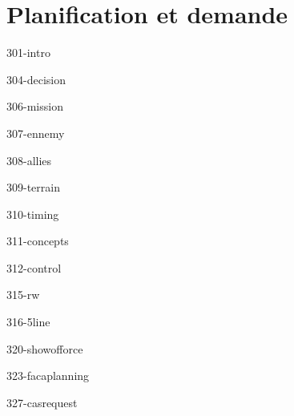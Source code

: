 \chapter{Planification et demande}

\begin{center}
\end{center}

{301-intro}

{304-decision}

{306-mission}

{307-ennemy}

{308-allies}

{309-terrain}

{310-timing}

{311-concepts}

{312-control}

{315-rw}

{316-5line}

{320-showofforce}

{323-facaplanning}

{327-casrequest}


